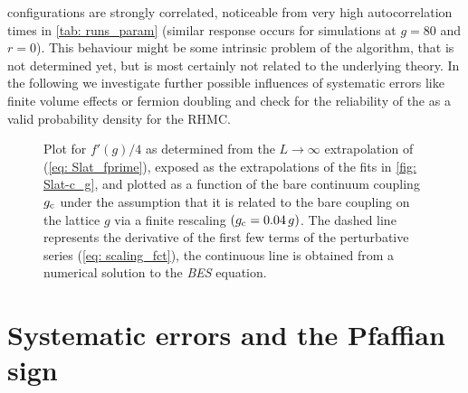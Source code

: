 configurations are strongly correlated, noticeable from very high autocorrelation times in \autoref{tab: runs_param} (similar response occurs for simulations at $g=80$ and $r=0$). This behaviour might be some intrinsic problem of the algorithm, that is not determined yet, but is most certainly not related to the underlying theory. In the following we investigate further possible influences of systematic errors like finite volume effects or fermion doubling and check for the reliability of the  as a valid probability density for the RHMC.
%
%
%
\begin{figure}
\centering

\caption{Plot for $f'(g)/4$ as determined from the $L\to\infty$ extrapolation of (\ref{eq: Slat_fprime}), exposed as the extrapolations of the fits in \autoref{fig: Slat-c_g}, and plotted as a function of the bare continuum coupling $g_{\rm c}$ under the assumption that it is related to the bare coupling on the lattice $g$ via a finite rescaling $(g_{\rm c}=0.04\, g)$. The dashed line represents the derivative of the first few terms of the perturbative series (\ref{eq: scaling_fct}), the continuous line is obtained from a numerical solution to the \textit{BES} equation.
\label{fig: f_prime_Lm4}}
\end{figure}
%
%
%
%
%
%
%
%
\section{Systematic errors and the Pfaffian sign}